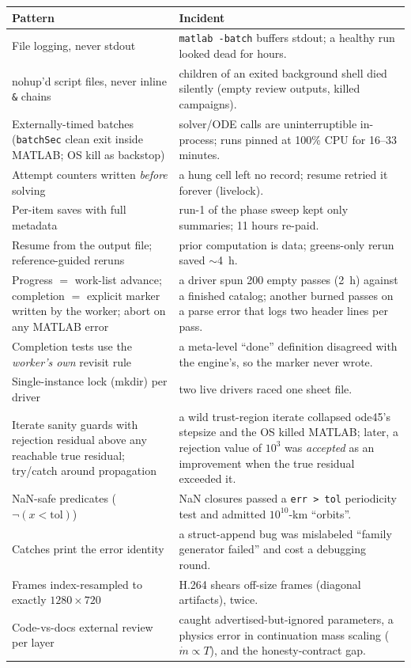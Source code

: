 \documentclass[11pt]{article}
\begin{document}
\begin{longtable}{p{}p{}}
\toprule
\textbf{Pattern} & \textbf{Incident}\\
\midrule
File logging, never stdout &
\texttt{matlab -batch} buffers stdout; a healthy run looked dead for
hours.\\
nohup'd script files, never inline \texttt{\&} chains &
children of an exited background shell died silently (empty review
outputs, killed campaigns).\\
Externally-timed batches (\texttt{batchSec} clean exit inside MATLAB;
OS kill as backstop) &
solver/ODE calls are uninterruptible in-process; runs pinned at 100\% CPU
for 16--33 minutes.\\
Attempt counters written \emph{before} solving &
a hung cell left no record; resume retried it forever (livelock).\\
Per-item saves with full metadata &
run-1 of the phase sweep kept only summaries; 11 hours re-paid.\\
Resume from the output file; reference-guided reruns &
prior computation is data; greens-only rerun saved $\sim$4~h.\\
Progress $=$ work-list advance; completion $=$ explicit marker written by
the worker; abort on any MATLAB error &
a driver spun 200 empty passes (2~h) against a finished catalog; another
burned passes on a parse error that logs two header lines per pass.\\
Completion tests use the \emph{worker's own} revisit rule &
a meta-level ``done'' definition disagreed with the engine's, so the
marker never wrote.\\
Single-instance lock (mkdir) per driver &
two live drivers raced one sheet file.\\
Iterate sanity guards with rejection residual above any reachable true
residual; try/catch around propagation &
a wild trust-region iterate collapsed ode45's stepsize and the OS killed
MATLAB; later, a rejection value of $10^3$ was \emph{accepted} as an
improvement when the true residual exceeded it.\\
NaN-safe predicates ($\lnot(x<\text{tol})$) &
NaN closures passed a \texttt{err > tol} periodicity test and admitted
$10^{10}$-km ``orbits''.\\
Catches print the error identity &
a struct-append bug was mislabeled ``family generator failed'' and cost a
debugging round.\\
Frames index-resampled to exactly $1280\times720$ &
H.264 shears off-size frames (diagonal artifacts), twice.\\
Code-vs-docs external review per layer &
caught advertised-but-ignored parameters, a physics error in continuation
mass scaling ($\dot m \propto T$), and the honesty-contract gap.\\
\bottomrule
\end{longtable}
\end{document}
